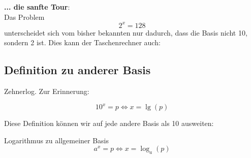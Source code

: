 
  \textbf{... die sanfte Tour}:\\

 Das Problem $$2^x=128$$ unterscheidet sich vom bisher bekannten nur
 dadurch, dass die Basis nicht 10, sondern 2 ist. Dies kann der
 Taschenrechner auch: 



\subsection{Definition zu anderer Basis}
 
\begin{bemerkung}{Zehnerlog.}{}
  Zur Erinnerung:

  $$10^x = p \Longleftrightarrow x = \lg(p)$$
\end{bemerkung}

Diese Definition können wir auf jede andere Basis als 10 ausweiten:

 \begin{definition}{Logarithmus zu allgemeiner Basis}{}
   $$a^x=p \Longleftrightarrow x = \log_a(p)$$
   \end{definition}

\newpage


